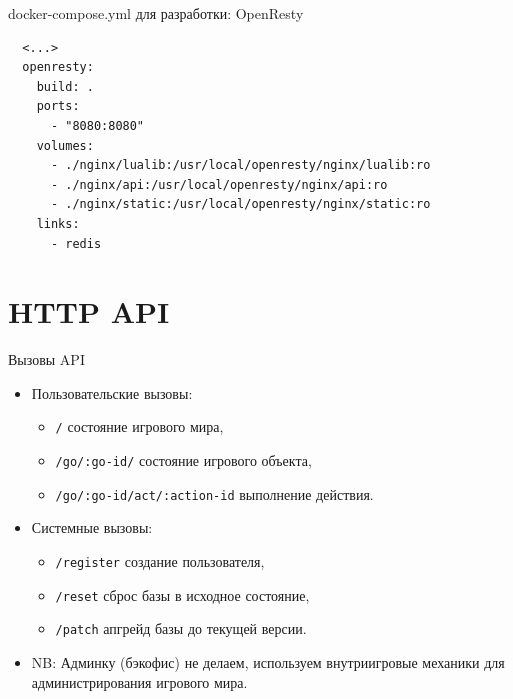 \documentclass[aspectratio=169,handout,bigger]{beamer}
\begin{document}

\begin{frame}[fragile]{docker-compose.yml для разработки: OpenResty}
\begin{verbatim}
  <...>
  openresty:
    build: .
    ports:
      - "8080:8080"
    volumes:
      - ./nginx/lualib:/usr/local/openresty/nginx/lualib:ro
      - ./nginx/api:/usr/local/openresty/nginx/api:ro
      - ./nginx/static:/usr/local/openresty/nginx/static:ro
    links:
      - redis
\end{verbatim}
\end{frame}


\section{HTTP API}


\begin{frame}{Вызовы API}
  \begin{itemize}
    \item Пользовательские вызовы:
      \begin{itemize}
        \item \texttt{/} состояние игрового мира,
        \item \texttt{/go/:go-id/} состояние игрового объекта,
        \item \texttt{/go/:go-id/act/:action-id} выполнение действия.
      \end{itemize}
    \item Системные вызовы:
    \begin{itemize}
      \item \texttt{/register} создание пользователя,
      \item \texttt{/reset} сброс базы в исходное состояние,
      \item \texttt{/patch} апгрейд базы до текущей версии.
    \end{itemize}
    \item NB: Админку (бэкофис) не делаем,
          используем внутриигровые механики для администрирования игрового мира.
  \end{itemize}
\end{frame}

\end{document}
